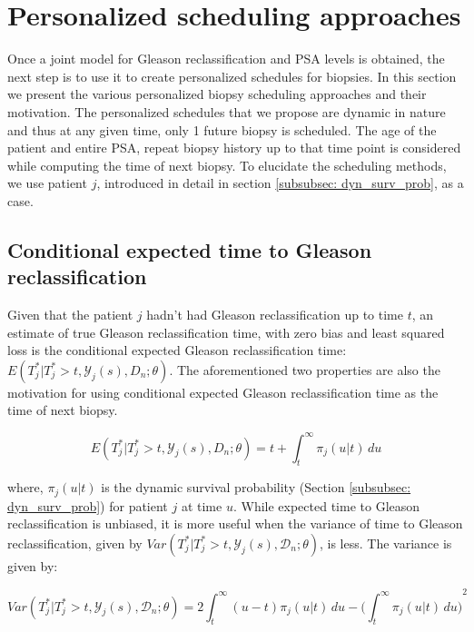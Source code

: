 \section{Personalized scheduling approaches}
\label{sec : personalized_scheduling}
Once a joint model for Gleason reclassification and PSA levels is obtained, the next step is to use it to create personalized schedules for biopsies. In this section we present the various personalized biopsy scheduling approaches and their motivation. The personalized schedules that we propose are dynamic in nature and thus at any given time, only 1 future biopsy is scheduled. The age of the patient and entire PSA, repeat biopsy history up to that time point is considered while computing the time of next biopsy. To elucidate the scheduling methods, we use patient $j$, introduced in detail in section \ref{subsubsec: dyn_surv_prob}, as a case.

\subsection{Conditional expected time to Gleason reclassification}
Given that the patient $j$ hadn't had Gleason reclassification up to time $t$, an estimate of true Gleason reclassification time, with zero bias and least squared loss is the conditional expected Gleason reclassification time: $E(T^*_j | T^*_j > t, \mathcal{Y}_j(s), D_n; \theta)$. The aforementioned two properties are also the motivation for using conditional expected Gleason reclassification time as the time of next biopsy. 

\begin{equation}
\label{eq : expectedFailureTime}
E(T^*_j | T^*_j > t, \mathcal{Y}_j(s), D_n; \theta) = t + \int_t^\infty \pi_j(u|t) \,du
\end{equation}

where, $\pi_j(u|t)$ is the dynamic survival probability (Section \ref{subsubsec: dyn_surv_prob}) for patient $j$ at time $u$. While expected time to Gleason reclassification is unbiased, it is more useful when the variance of time to Gleason reclassification, given by $Var(T^*_j | T^*_j >t, \mathcal{Y}_j(s), \mathcal{D}_n; \theta)$, is less. The variance is given by:

\begin{equation}
\label{eq : varFailureTime}
Var(T^*_j | T^*_j >t, \mathcal{Y}_j(s), \mathcal{D}_n; \theta) = 2 \int_t^\infty {(u-t) \pi_j(u|t) \,du} - {\bigg(\int_t^\infty \pi_j(u|t) \,du\bigg)}^2
\end{equation}

